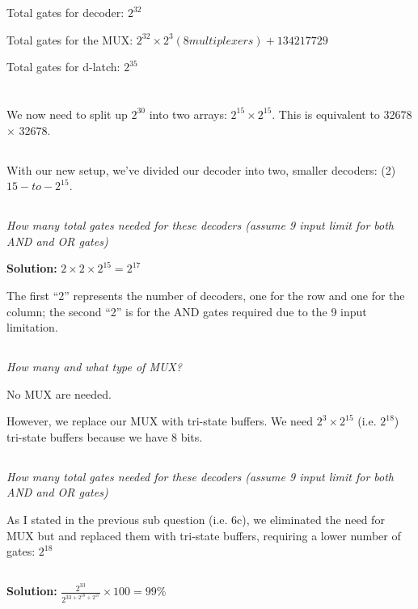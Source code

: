 \documentclass{article}
\begin{document}
Total gates for decoder: $2^{32}$

Total gates for the MUX: $2^{32} \times 2^{3} (8 multiplexers) + 134217729$

Total gates for d-latch: $2^{35}$


\section{}

We now need to split up $2^{30}$ into two arrays: $2^{15} \times 2^{15}$. This is equivalent to 32678 $\times$ 32678.

\subsection{}

With our new setup, we've divided our decoder into two, smaller decoders: (2) $15-to-2^{15}$.

\subsection{}
\textit{How many total gates needed for these decoders (assume 9 input limit for both AND and OR gates)}

\textbf{Solution:} $2 \times 2 \times 2^{15} = 2^{17}$

The first ``2'' represents the number of decoders, one for the row and one for the column; the second ``2'' is for the AND gates required due to the 9 input limitation.

\subsection{}
\textit{How many and what type of MUX?}

No MUX are needed.

However, we replace our MUX with tri-state buffers. We need $2^3 \times 2^{15}$ (i.e. $2^{18}$) tri-state buffers because we have 8 bits.

\subsection{}
\textit{How many total gates needed for these decoders (assume 9 input limit for both AND and OR gates)}

As I stated in the previous sub question (i.e. 6c), we eliminated the need for MUX but and replaced them with tri-state buffers, requiring a lower number of gates: $2^{18}$

\subsection{}

\textbf{Solution:} $\frac{2^{33}}{2^{33 + 2^{18} + 2^{15}}} \times 100 = 99\%$
\end{document}
